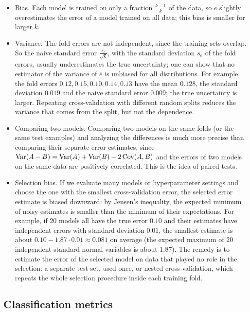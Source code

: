 \begin{itemize}
    \item Bias. Each model is trained on only a fraction $\frac{k - 1}{k}$ of the data, so $\bar e$ slightly overestimates the error of a model trained on all data; this bias is smaller for larger $k$.
    \item Variance. The fold errors are not independent, since the training sets overlap. So the naive standard error $\frac{s_e}{\sqrt{k}}$, with the standard deviation $s_e$ of the fold errors, usually underestimates the true uncertainty; one can show that no estimator of the variance of $\bar e$ is unbiased for all distributions. For example, the fold errors $0.12, 0.15, 0.10, 0.14, 0.13$ have the mean $0.128$, the standard deviation $0.019$ and the naive standard error $0.009$; the true uncertainty is larger. Repeating cross-validation with different random splits reduces the variance that comes from the split, but not the dependence.
    \item Comparing two models. Comparing two models on the same folds (or the same test examples) and analyzing the differences is much more precise than comparing their separate error estimates, since $\operatorname{Var}(A - B) = \operatorname{Var}(A) + \operatorname{Var}(B) - 2\operatorname{Cov}(A, B)$ and the errors of two models on the same data are positively correlated. This is the idea of paired tests.
    \item Selection bias. If we evaluate many models or hyperparameter settings and choose the one with the smallest cross-validation error, the selected error estimate is biased downward: by Jensen's inequality, the expected minimum of noisy estimates is smaller than the minimum of their expectations. For example, if $20$ models all have the true error $0.10$ and their estimates have independent errors with standard deviation $0.01$, the smallest estimate is about $0.10 - 1.87 \cdot 0.01 \approx 0.081$ on average (the expected maximum of $20$ independent standard normal variables is about $1.87$). The remedy is to estimate the error of the selected model on data that played no role in the selection: a separate test set, used once, or nested cross-validation, which repeats the whole selection procedure inside each training fold.
\end{itemize}

\subsection{Classification metrics}\label{L4-sec:classification-metrics}

